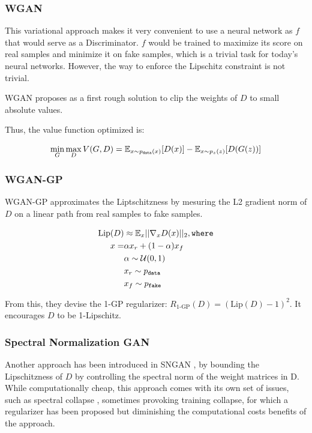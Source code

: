 \subsubsection{\ac{WGAN}}

This variational approach makes it very convenient to use a neural network as $f$ that would serve as a Discriminator. $f$ would be trained to maximize its score on real samples and minimize it on fake samples, which is a trivial task for today's neural networks. However, the way to enforce the Lipschitz constraint is not trivial.


\ac{WGAN} \citep{wgan} proposes as a first rough solution to clip the weights of $D$ to small absolute values.

Thus, the value function optimized is:

\begin{equation}
    \min_G \max_D V(G, D) = \mathbb{E}_{x \sim p_\texttt{data}(x)}[D(x)] - \mathbb{E}_{x\sim p_z(z)}[D(G(z))]
\end{equation}

\subsubsection{\ac{WGAN-GP}}

\ac{WGAN-GP} \citep{wgangp} approximates the Liptschitzness by mesuring the L2 gradient norm of $D$ on a linear path from real samples to fake samples.

\begin{equation}
\begin{split}
    \text{Lip}(D) &\approx \mathbb{E}_x  ||\nabla_x D(x)||_2, \texttt{where} \\
    x = & \alpha x_r + (1-\alpha) x_f \\
    & \alpha \sim \mathcal{U}(0, 1) \\
    & x_r \sim p_\texttt{data} \\
    & x_f  \sim p_\texttt{fake}
\end{split}
\end{equation}

From this, they devise the 1-GP regularizer: $R_\text{1-GP}(D) = (\text{Lip}(D) - 1)^2$. It encourages $D$ to be 1-Lipschitz.

\subsubsection{Spectral Normalization \ac{GAN}}

Another approach has been introduced in \ac{SNGAN} \citep{SNGAN}, by bounding the Lipschitzness of $D$ by controlling the spectral norm of the weight matrices in D. While computationally cheap, this approach comes with its own set of issues, such as spectral collapse \citep{biggan}, sometimes provoking training collapse, for which a regularizer has been proposed \citep{spectralcollapse} but diminishing the computational costs benefits of the approach.

